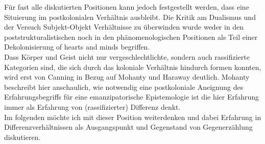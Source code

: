 Für fast alle diskutierten Positionen kann jedoch festgestellt werden, dass
eine Situierung im postkolonialen Verhältnis ausbleibt. Die Kritik am Dualismus
und der Versuch Subjekt-Objekt Verhältnisse zu überwinden wurde weder in den
poststrukturalistischen noch in den phänomenologischen Positionen als Teil
einer Dekolonisierung \glqq of hearts and minds \grqq begriffen.\\
Dass Körper und Geist
nicht nur vergeschlechtlichte, sondern auch rassifizierte Kategorien sind, die
sich durch das koloniale Verhältnis hindurch formen konnten, wird erst von
Canning in Bezug auf Mohanty und Haraway deutlich. Mohanty beschreibt hier
anschaulich, wie notwendig eine postkoloniale Aneignung des Erfahrungsbegriffs
für eine emanzipatorische Epistemologie ist die hier Erfahrung immer als
Erfahrung von (rassifizierter) Differenz denkt.
\\

Im folgenden möchte ich mit dieser Position weiterdenken und dabei Erfahrung in
Differenzverhältnissen als Ausgangspunkt und Gegenstand von Gegenerzählung diskutieren.
